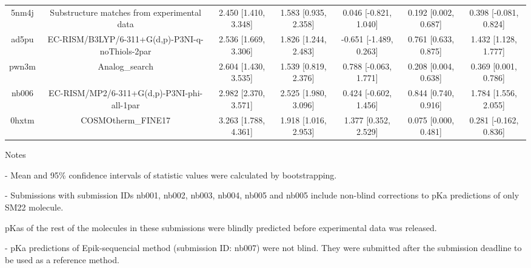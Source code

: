 \documentclass{article}
\begin{document}
\begin{center}
\begin{longtable}{|ccccccc|}
 5nm4j &        Substructure matches from experimental data &    2.450 [1.410, 3.348] &   1.583 [0.935, 2.358] &     0.046 [-0.821, 1.040] &  0.192 [0.002, 0.687] &   0.398 [-0.081, 0.824] \\
 ad5pu &    EC-RISM/B3LYP/6-311+G(d,p)-P3NI-q-noThiols-2par &    2.536 [1.669, 3.306] &   1.826 [1.244, 2.483] &    -0.651 [-1.489, 0.263] &  0.761 [0.633, 0.875] &    1.432 [1.128, 1.777] \\
 pwn3m &                                     Analog\_search &    2.604 [1.430, 3.535] &   1.539 [0.819, 2.376] &     0.788 [-0.063, 1.771] &  0.208 [0.004, 0.638] &    0.369 [0.001, 0.786] \\
 nb006 &         EC-RISM/MP2/6-311+G(d,p)-P3NI-phi-all-1par &    2.982 [2.370, 3.571] &   2.525 [1.980, 3.096] &     0.424 [-0.602, 1.456] &  0.844 [0.740, 0.916] &    1.784 [1.556, 2.055] \\
 0hxtm &                                 COSMOtherm\_FINE17 &    3.263 [1.788, 4.361] &   1.918 [1.016, 2.953] &      1.377 [0.352, 2.529] &  0.075 [0.000, 0.481] &   0.281 [-0.162, 0.836] \\
\end{longtable}
\end{center}

Notes

- Mean and 95\% confidence intervals of statistic values were calculated by bootstrapping.

- Submissions with submission IDs nb001, nb002, nb003, nb004, nb005 and nb005 include non-blind corrections to pKa predictions of only SM22 molecule.

pKas of the rest of the molecules in these submissions were blindly predicted before experimental data was released.

- pKa predictions of Epik-sequencial method (submission ID: nb007) were not blind. They were submitted after the submission deadline to be used as a reference method.
\end{document}
